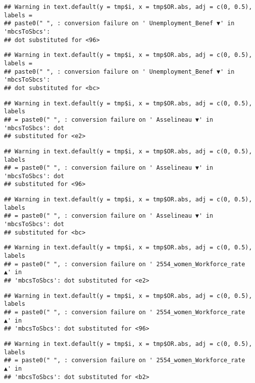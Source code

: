\documentclass[
]{article}
\begin{document}
\begin{verbatim}
## Warning in text.default(y = tmp$i, x = tmp$OR.abs, adj = c(0, 0.5), labels =
## paste0(" ", : conversion failure on ' Unemployment_Benef ▼' in 'mbcsToSbcs':
## dot substituted for <96>
\end{verbatim}

\begin{verbatim}
## Warning in text.default(y = tmp$i, x = tmp$OR.abs, adj = c(0, 0.5), labels =
## paste0(" ", : conversion failure on ' Unemployment_Benef ▼' in 'mbcsToSbcs':
## dot substituted for <bc>
\end{verbatim}

\begin{verbatim}
## Warning in text.default(y = tmp$i, x = tmp$OR.abs, adj = c(0, 0.5), labels
## = paste0(" ", : conversion failure on ' Asselineau ▼' in 'mbcsToSbcs': dot
## substituted for <e2>
\end{verbatim}

\begin{verbatim}
## Warning in text.default(y = tmp$i, x = tmp$OR.abs, adj = c(0, 0.5), labels
## = paste0(" ", : conversion failure on ' Asselineau ▼' in 'mbcsToSbcs': dot
## substituted for <96>
\end{verbatim}

\begin{verbatim}
## Warning in text.default(y = tmp$i, x = tmp$OR.abs, adj = c(0, 0.5), labels
## = paste0(" ", : conversion failure on ' Asselineau ▼' in 'mbcsToSbcs': dot
## substituted for <bc>
\end{verbatim}

\begin{verbatim}
## Warning in text.default(y = tmp$i, x = tmp$OR.abs, adj = c(0, 0.5), labels
## = paste0(" ", : conversion failure on ' 2554_women_Workforce_rate ▲' in
## 'mbcsToSbcs': dot substituted for <e2>
\end{verbatim}

\begin{verbatim}
## Warning in text.default(y = tmp$i, x = tmp$OR.abs, adj = c(0, 0.5), labels
## = paste0(" ", : conversion failure on ' 2554_women_Workforce_rate ▲' in
## 'mbcsToSbcs': dot substituted for <96>
\end{verbatim}

\begin{verbatim}
## Warning in text.default(y = tmp$i, x = tmp$OR.abs, adj = c(0, 0.5), labels
## = paste0(" ", : conversion failure on ' 2554_women_Workforce_rate ▲' in
## 'mbcsToSbcs': dot substituted for <b2>
\end{verbatim}
\end{document}
